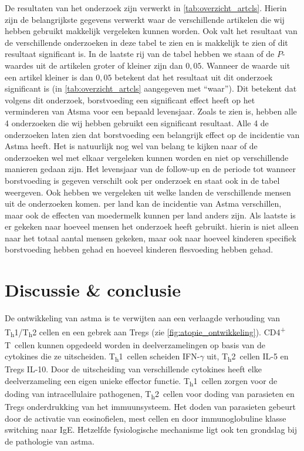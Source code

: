 \documentclass[abstract=true]{scrartcl}
\begin{document}
De resultaten van het onderzoek zijn verwerkt in \cref{tab:overzicht_artcls}. Hierin zijn de belangrijkste gegevens verwerkt waar de verschillende artikelen die wij hebben gebruikt makkelijk vergeleken kunnen worden. Ook valt het resultaat van de verschillende onderzoeken in deze tabel te zien en is makkelijk te zien of dit resultaat significant is. In de laatste rij van de tabel hebben we staan of de $P$-waardes uit de artikelen groter of kleiner zijn dan $0,05$. Wanneer de waarde uit een artikel kleiner is dan $0,05$ betekent dat het resultaat uit dit onderzoek significant is (in \cref{tab:overzicht_artcls} aangegeven met “waar”). Dit betekent dat volgens dit onderzoek, borstvoeding een significant effect heeft op het verminderen van Atsma voor een bepaald levensjaar. Zoals te zien is, hebben alle 4 onderzoeken die wij hebben gebruikt een significant resultaat. Alle 4 de onderzoeken laten zien dat borstvoeding een belangrijk effect op de incidentie van Astma heeft. Het is natuurlijk nog wel van belang te kijken naar of de onderzoeken wel met elkaar vergeleken kunnen worden en niet op verschillende manieren gedaan zijn. Het levensjaar van de follow-up en de periode tot wanneer borstvoeding is gegeven verschilt ook per onderzoek en staat ook in de tabel weergeven. Ook hebben we vergeleken uit welke landen de verschillende mensen uit de onderzoeken komen. per land kan de incidentie van Astma verschillen, maar ook de effecten van moedermelk kunnen per land anders zijn. Als laatste is er gekeken naar hoeveel mensen het onderzoek heeft gebruikt. hierin is niet alleen naar het totaal aantal mensen gekeken, maar ook naar hoeveel kinderen specifiek borstvoeding hebben gehad en hoeveel kinderen flesvoeding hebben gehad. 

\section{Discussie \& conclusie}

De ontwikkeling van astma is te verwijten aan een verlaagde verhouding van T\textsubscript{h}1/T\textsubscript{h}2 cellen en een gebrek aan Tregs (zie \cref{fig:atopie_ontwikkeling}). CD4\textsuperscript{+} T~cellen kunnen opgedeeld worden in deelverzamelingen op basis van de cytokines die ze uitscheiden. T\textsubscript{h}1~cellen scheiden IFN-$\gamma$ uit, T\textsubscript{h}2~cellen IL-5 en Tregs IL-10. Door de uitscheiding van verschillende cytokines heeft elke deelverzameling een eigen unieke effector functie. T\textsubscript{h}1~cellen zorgen voor de doding van intracellulaire pathogenen, T\textsubscript{h}2~cellen voor doding van parasieten en Tregs onderdrukking van het immuunsysteem. Het doden van parasieten gebeurt door de activatie van eosinofielen, mest cellen en door immunoglobuline klasse switching naar IgE. Hetzelfde fysiologische mechanisme ligt ook ten grondslag bij de pathologie van astma.
\end{document}
